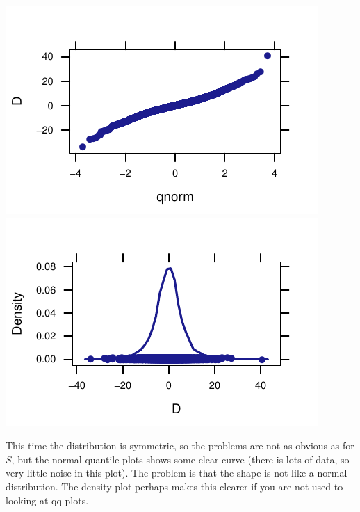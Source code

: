 \documentclass[twoside]{book}\usepackage[]{graphicx}\usepackage[]{xcolor}
\makeatletter
\def\maxwidth{ %
  \ifdim\Gin@nat@width>\linewidth
    \linewidth
  \else
    \Gin@nat@width
  \fi
}
\newenvironment{knitrout}{}{} %
\makeatother
\begin{document}
\begin{solution}
\begin{knitrout}
{\centering \includegraphics[width=\maxwidth]{figures/fig-unnamed-chunk-140-1} 
\includegraphics[width=\maxwidth]{figures/fig-unnamed-chunk-140-2} 

}



\end{knitrout}

This time the distribution is symmetric, so the problems are not as obvious as for $S$, but the 
normal quantile plots shows some clear curve (there is lots of data, so very little noise in
this plot).  The problem is that the shape is not like a normal distribution.  
The density plot perhaps makes this clearer if you are not used to looking at qq-plots.
\end{solution}

% 	
\end{document}
